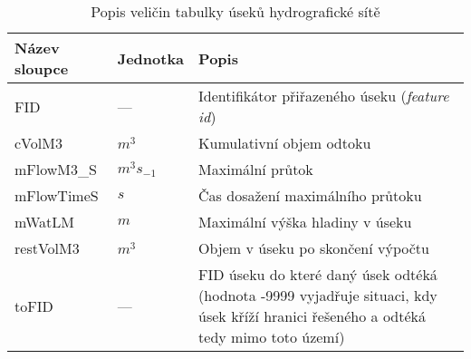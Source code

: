 



\begin{table}[t]
 

 \centering
 \caption{Popis veličin  tabulky úseků hydrografické sítě}
\label{tab:useky}

 \begin{tabular}{llp{}}
  \hline  \hline
 Název sloupce        & Jednotka     & Popis                                 \\ 
 \hline
 FID            &   ---          &  Identifikátor přiřazeného úseku ({\it feature id})   \\
 cVolM3         &  $m^3$         & Kumulativní objem odtoku                              \\
 mFlowM3\_S      &   $m^3s_{-1}$  & Maximální průtok                                      \\
 mFlowTimeS     &   $s$          &  Čas dosažení maximálního průtoku                     \\
 mWatLM         &  $m$       &  Maximální výška hladiny v úseku                               \\
 restVolM3      &  $m^3$     &  Objem v úseku po skončení výpočtu         \\
 toFID          &  ---       &  FID úseku do které daný úsek odtéká (hodnota -9999 vyjadřuje situaci, kdy úsek kříží hranici řešeného a odtéká tedy mimo toto území) \\
  \hline
   \hline
 \end{tabular}

\end{table}




